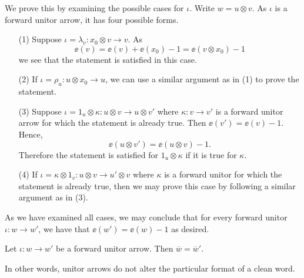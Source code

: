 \begin{prf}
    We prove this by examining the possible cases for $\iota$. 
    Write $w = u \otimes v$.
    As $\iota$ is a forward unitor arrow, it has four possible forms. 

    \begin{itemize}
        \item[(1)] Suppose $\iota = \lambda_v: x_0 \otimes v \to v$. 
        As 
        \[
            \ee(v) = \ee(v) + \ee(x_0) - 1 = \ee(v \otimes x_0) - 1   
        \]
        we see that the statement is satisfied in this case.

        \item[(2)] If $\iota = \rho_u: u \otimes x_0 \to u$,
        we can use a similar argument as in (1) to prove the statement.

        \item[(3)] Suppose $\iota = 1_{u} \otimes \kappa: u \otimes v \to u \otimes v'$ 
        where $\kappa: v \to v'$ is a forward unitor arrow for which the 
        statement is already true. Then $\ee(v') = \ee(v) - 1$. Hence, 
        \[
            \ee(u \otimes v') = \ee(u \otimes v) - 1. 
        \]
        Therefore the statement is satisfied for $1_u \otimes \kappa$ if it is 
        true for $\kappa$. 

        \item[(4)] If $\iota = \kappa \otimes 1_v: u \otimes v \to u' \otimes v$
        where $\kappa$ is a forward unitor for which the statement is already true, 
        then we may prove this case by following a similar argument as in (3). 
    \end{itemize}
    As we have examined all cases, we may conclude that for every 
    forward unitor $\iota: w \to w'$, we have that $\ee(w') = \ee(w) - 1$ 
    as desired. 
\end{prf}

\begin{lemma}\label{lemma:unitors_preserve_clean_word}
    Let $\iota: w \to w'$ be a forward unitor arrow. Then 
    $\overline{w} = \overline{w}'$. 
\end{lemma}

In other words, unitor arrows do not alter the particular format of a
clean word.

